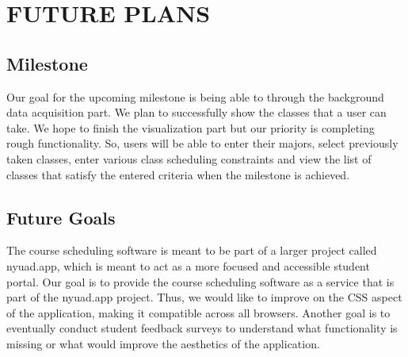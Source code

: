 \documentclass[a4paper, 11.5 pt, conference]{ieeeconf}  %
\begin{document}
\section{FUTURE PLANS}

\subsection{Milestone}
\noindent Our goal for the upcoming milestone is being able to through the background data acquisition part. We plan to successfully show the classes that a user can take. We hope to finish the visualization part but our priority is completing rough functionality. So, users will be able to enter their majors, select previously taken classes, enter various class scheduling constraints and view the list of classes that satisfy the entered criteria when the milestone is achieved.

\subsection{Future Goals}
\noindent The course scheduling software is meant to be part of a larger project called nyuad.app, which is meant to act as a more focused and accessible student portal. Our goal is to provide the course scheduling software as a service that is part of the nyuad.app project. Thus, we would like to improve on the CSS aspect of the application, making it compatible across all browsers. Another goal is to eventually conduct student feedback surveys to understand what functionality is missing or what would improve the aesthetics of the application. 



\printbibliography
\end{document}
